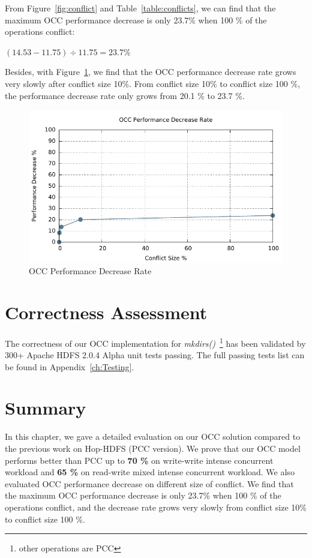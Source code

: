 \noindent From Figure~\ref{fig:conflict} and Table~\ref{table:conflicts}, we can find that the maximum OCC performance decrease is only 23.7\% when 100 \% of the operations conflict:
\begin{center}
	$(14.53-11.75) \div 11.75 = 23.7\%$
\end{center}

\noindent Besides, with Figure~\ref{fig:conRate}, we find that the OCC performance decrease rate grows very slowly after conflict size 10\%. From conflict size 10\% to conflict size 100 \%, the performance decrease rate only grows from 20.1 \% to 23.7 \%.

\begin{figure}[ht]
	\centering
	\includegraphics[width=\linewidth]{figs/conRate.pdf}
	\caption{OCC Performance Decrease Rate}
	\label{fig:conRate}
\end{figure}

\section{Correctness Assessment}

The correctness of our OCC implementation for \textit{mkdirs()}~\footnote{other operations are PCC} has been validated by 300+ Apache HDFS 2.0.4 Alpha unit tests passing. The full passing tests list can be found in Appendix~\ref{ch:Testing}.

\section*{Summary}
In this chapter, we gave a detailed evaluation on our OCC solution compared to the previous work on Hop-HDFS (PCC version). We prove that our OCC model performs better than PCC up to \textbf{70 \%} on write-write intense concurrent workload and \textbf{65 \%} on read-write mixed intense concurrent workload. We also evaluated OCC performance decrease on different size of conflict. We find that the maximum OCC performance decrease is only 23.7\% when 100 \% of the operations conflict, and the decrease rate grows very slowly from conflict size 10\% to conflict size 100 \%.
